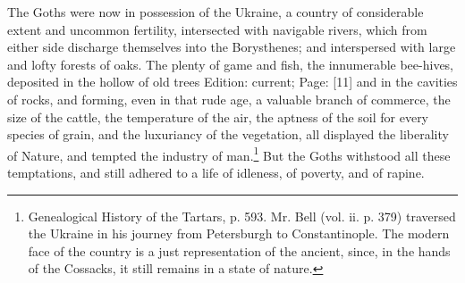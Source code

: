 The Goths were now in possession of the Ukraine, a country of considerable extent and uncommon fertility, intersected with navigable rivers, which from either side discharge themselves into the Borysthenes; and interspersed with large and lofty forests of oaks. The plenty of game and fish, the innumerable bee-hives, deposited in the hollow of old trees Edition: current; Page: [11] and in the cavities of rocks, and forming, even in that rude age, a valuable branch of commerce, the size of the cattle, the temperature of the air, the aptness of the soil for every species of grain, and the luxuriancy of the vegetation, all displayed the liberality of Nature, and tempted the industry of man.\footnote{Genealogical History of the Tartars, p. 593. Mr. Bell (vol. ii. p. 379) traversed the Ukraine in his journey from Petersburgh to Constantinople. The modern face of the country is a just representation of the ancient, since, in the hands of the Cossacks, it still remains in a state of nature.} But the Goths withstood all these temptations, and still adhered to a life of idleness, of poverty, and of rapine.

